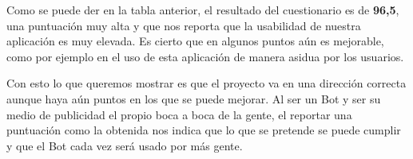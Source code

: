 Como se puede der en la tabla anterior, el resultado del cuestionario es de \textbf{96,5}, una puntuación muy alta y que nos reporta que la usabilidad de nuestra aplicación es muy elevada. Es cierto que en algunos puntos aún es mejorable, como por ejemplo en el uso de esta aplicación de manera asidua por los usuarios.

Con esto lo que queremos mostrar es que el proyecto va en una dirección correcta aunque haya aún puntos en los que se puede mejorar. Al ser un Bot y ser su medio de publicidad el propio boca a boca de la gente, el reportar una puntuación como la obtenida nos indica que lo que se pretende se puede cumplir y que el Bot cada vez será usado por más gente.